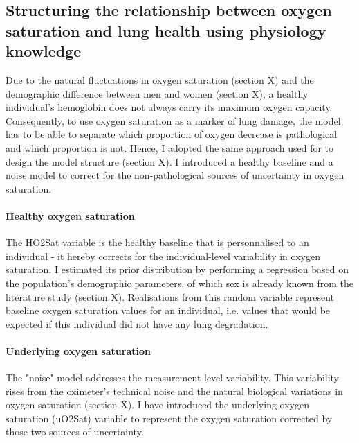 \subsection{Structuring the relationship between oxygen saturation and lung health using physiology knowledge}
Due to the natural fluctuations in oxygen saturation (section X) and the demographic difference between men and women (section X), a healthy individual's hemoglobin does not always carry its maximum oxygen capacity. Consequently, to use oxygen saturation as a marker of lung damage, the model has to be able to separate which proportion of oxygen decrease is pathological and which proportion is not. Hence, I adopted the same approach used for \F to design the model structure (section X). I introduced a healthy baseline and a noise model to correct for the non-pathological sources of uncertainty in oxygen saturation.

\paragraph{Healthy oxygen saturation}
The HO2Sat variable is the healthy baseline that is personnalised to an individual - it hereby corrects for the individual-level variability in oxygen saturation. I estimated its prior distribution by performing a regression based on the population's demographic parameters, of which sex is already known from the literature study (section X). Realisations from this random variable represent baseline oxygen saturation values for an individual, i.e. values that would be expected if this individual did not have any lung degradation.

\paragraph{Underlying oxygen saturation}
The "noise" model addresses the measurement-level variability. This variability rises from the oximeter's technical noise and the natural biological variations in oxygen saturation (section X). I have introduced the underlying oxygen saturation (uO2Sat) variable to represent the oxygen saturation corrected by those two sources of uncertainty.

